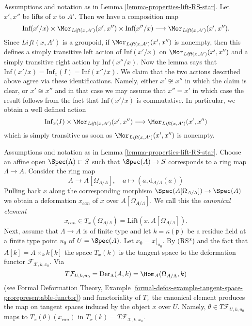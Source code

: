 \begin{remark}[Automorphisms]
\label{remark-automorphisms}
Assumptions and notation as in Lemma \ref{lemma-properties-lift-RS-star}.
Let $x', x''$ be lifts of $x$ to $A'$. Then we have a composition
map
$$
\text{Inf}(x'/x) \times
\Mor_{\textit{Lift}(x, A')}(x', x'') \times \text{Inf}(x''/x)
\longrightarrow
\Mor_{\textit{Lift}(x, A')}(x', x'').
$$
Since $\textit{Lift}(x, A')$ is a groupoid, if
$\Mor_{\textit{Lift}(x, A')}(x', x'')$ is nonempty, then this defines
a simply transitive left action of $\text{Inf}(x'/x)$ on
$\Mor_{\textit{Lift}(x, A')}(x', x'')$ and a simply transitive
right action by $\text{Inf}(x''/x)$. Now the lemma says that
$\text{Inf}(x'/x) = \text{Inf}_x(I) = \text{Inf}(x''/x)$.
We claim that the two actions described above agree via these identifications.
Namely, either $x' \not \cong x''$ in which the claim is clear, or
$x' \cong x''$ and in that case we may assume that $x'' = x'$ in which
case the result follows from the fact that $\text{Inf}(x'/x)$ is
commutative. In particular, we obtain a well defined action
$$
\text{Inf}_x(I) \times \Mor_{\textit{Lift}(x, A')}(x', x'')
\longrightarrow
\Mor_{\textit{Lift}(x, A')}(x', x'')
$$
which is simply transitive as soon as $\Mor_{\textit{Lift}(x, A')}(x', x'')$
is nonempty.
\end{remark}

\begin{remark}
\label{remark-canonical-element}
Assumptions and notation as in Lemma \ref{lemma-properties-lift-RS-star}.
Choose an affine open $\Spec(\Lambda) \subset S$ such that $\Spec(A) \to S$
corresponds to a ring map $\Lambda \to A$. Consider the ring map
$$
A \longrightarrow A[\Omega_{A/\Lambda}],
\quad
a \longmapsto (a, \text{d}_{A/\Lambda}(a))
$$
Pulling back $x$ along the corresponding morphism
$\Spec(A[\Omega_{A/\Lambda}]) \to \Spec(A)$ we obtain a
deformation $x_{can}$ of $x$ over $A[\Omega_{A/\Lambda}]$. We call this
the {\it canonical element}
$$
x_{can} \in T_x(\Omega_{A/\Lambda}) = \text{Lift}(x, A[\Omega_{A/\Lambda}]).
$$
Next, assume that $\Lambda \to A$ is of finite type and let
$k = \kappa(\mathfrak p)$ be a residue field at a finite type point $u_0$
of $U = \Spec(A)$. Let $x_0 = x|_{u_0}$. By (RS*) and the fact that
$A[k] = A \times_k k[k]$ the space $T_x(k)$ is the tangent space to the
deformation functor $\mathcal{F}_{\mathcal{X}, k, x_0}$. Via
$$
T\mathcal{F}_{U, k, u_0} =
\text{Der}_\Lambda(A, k) = \Hom_A(\Omega_{A/\Lambda}, k)
$$
(see Formal Deformation Theory, Example
\ref{formal-defos-example-tangent-space-prorepresentable-functor})
and functoriality of $T_x$ the canonical element produces the map
on tangent spaces induced by the object $x$ over $U$. Namely,
$\theta \in T\mathcal{F}_{U, k, u_0}$ maps to $T_x(\theta)(x_{can})$
in $T_x(k) = T\mathcal{F}_{\mathcal{X}, k, x_0}$.
\end{remark}

